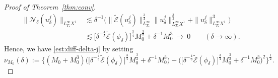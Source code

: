 \documentclass{amsart}
\numberwithin{equation}{section}
\begin{document}
\begin{proof}[Proof of Theorem~\ref{thm:conv}]
\begin{align*}
\| \mathcal{N}_\delta(u_\delta^j)\|_{L^\infty_{T_*}X^1}&\lesssim \delta^{-1}\big( \| \widetilde{\mathcal{E}}(u_\delta^j)\|_{L^\infty_{T_*}}^{\frac34}\| u_\delta^j\|_{L^\infty_{T_*}X^1}^{\frac32}+\| u_\delta^j\|_{L^\infty_{T_*}X^1}^3\big) \\
&\lesssim \big[ \delta^{-\frac43}\widetilde{\mathcal{E}}(\phi_\delta)\big]^{\frac34} M_0^{\frac32}+\delta^{-1}M_0^3 \ \to \ 0\qquad (\delta \to \infty).
\end{align*}
Hence, we have \eqref{est:diff-delta-j} by setting
\[ \nu _{M_0}(\delta):=\Big\{ (M_0+M_0^3)\Big( \big[ \delta^{-\frac43}\widetilde{\mathcal{E}}(\phi_\delta)\big]^{\frac34} M_0^{\frac32}+\delta^{-1}M_0^3\Big) +\Big( \big[ \delta^{-\frac43}\widetilde{\mathcal{E}}(\phi_\delta)\big]^{\frac34} M_0^{\frac32}+\delta^{-1}M_0^3\Big)^2\Big\}^{\frac12} .\]


\end{proof}
\end{document}
